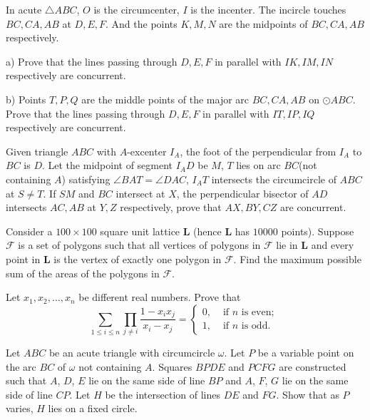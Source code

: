 \documentclass[11pt]{scrartcl}
\begin{document}
\begin{problem}[423911944927735]
In acute $\triangle ABC$, $O$ is the circumcenter, $I$ is the incenter. The incircle touches $BC,CA,AB$ at $D,E,F$. And the points $K,M,N$ are the midpoints of $BC,CA,AB$ respectively.

a) Prove that the lines passing through $D,E,F$ in parallel with $IK,IM,IN$ respectively are concurrent.

b) Points $T,P,Q$ are the middle points of the major arc $BC,CA,AB$ on $\odot ABC$. Prove that the lines passing through $D,E,F$ in parallel with $IT,IP,IQ$ respectively are concurrent.
\end{problem}
\begin{problem}[5835156231907738776]
Given triangle $ABC$ with $A$-excenter $I_A$, the foot of the perpendicular from $I_A$ to $BC$ is $D$. Let the midpoint of segment $I_AD$ be $M$, $T$ lies on arc $BC$(not containing $A$) satisfying $\angle BAT=\angle DAC$, $I_AT$ intersects the circumcircle of $ABC$ at $S\neq T$. If $SM$ and $BC$ intersect at $X$, the perpendicular bisector of $AD$ intersects $AC,AB$ at $Y,Z$ respectively, prove that $AX,BY,CZ$ are concurrent.
\end{problem}
\begin{problem}[275429739915708]
Consider a $100\times 100$ square unit lattice $\textbf{L}$ (hence $\textbf{L}$ has $10000$ points). Suppose $\mathcal{F}$ is a set of polygons such that all vertices of polygons in $\mathcal{F}$ lie in $\textbf{L}$ and every point in $\textbf{L}$ is the vertex of exactly one polygon in $\mathcal{F}.$ Find the maximum possible sum of the areas of the polygons in $\mathcal{F}.$
\end{problem}
\begin{problem}[443006607452241]
Let $x_1, x_2, \dots, x_n$ be different real numbers. Prove that
\[\sum_{1 \leqslant i \leqslant n} \prod_{j \neq i} \frac{1-x_{i} x_{j}}{x_{i}-x_{j}}=\left\{\begin{array}{ll}
0, & \text { if } n \text { is even; } \\
1, & \text { if } n \text { is odd. }
\end{array}\right.\]
\end{problem}
\begin{problem}[8700998965901287095]
Let \(ABC\) be an acute triangle with circumcircle \(\omega\). Let \(P\) be a variable point on the arc \(BC\) of \(\omega\) not containing \(A\). Squares \(BPDE\) and \(PCFG\) are constructed such that \(A\), \(D\), \(E\) lie on the same side of line \(BP\) and \(A\), \(F\), \(G\) lie on the same side of line \(CP\). Let \(H\) be the intersection of lines \(DE\) and \(FG\). Show that as \(P\) varies, \(H\) lies on a fixed circle.
\end{problem}
\end{document}
